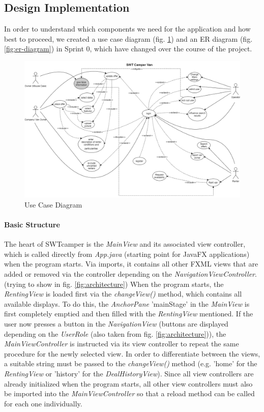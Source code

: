 \subsection{Design Implementation}
In order to understand which components we need for the application and how best to proceed, we created a use case diagram (fig. \ref{fig:use-case-diagram}) and an ER diagram (fig. \ref{fig:er-diagram}) in Sprint 0, which have changed over the course of the project.

\begin{figure}[h]
	\centering
	\includegraphics[width=12cm]{resources/images/use-case-diagram.png}
	\caption{Use Case Diagram}
	\label{fig:use-case-diagram}
\end{figure}

\paragraph{Basic Structure}
The heart of SWTcamper is the \textit{MainView} and its associated view controller, which is called directly from \textit{App.java} (starting point for JavaFX applications) when the program starts. Via imports, it contains all other FXML views that are added or removed via the controller depending on the \textit{NavigationViewController}. (trying to show in fig. \ref{fig:architecture}) When the program starts, the \textit{RentingView} is loaded first via the \textit{changeView()} method, which contains all available displays. To do this, the \textit{AnchorPane} 'mainStage' in the \textit{MainView} is first completely emptied and then filled with the \textit{RentingView} mentioned. If the user now presses a button in the \textit{NavigationView} (buttons are displayed depending on the \textit{UserRole} (also taken from fig. \ref{fig:architecture})), the \textit{MainViewController} is instructed via its view controller to repeat the same procedure for the newly selected view. In order to differentiate between the views, a suitable string must be passed to the \textit{changeView()} method (e.g. 'home' for the \textit{RentingView} or 'history' for the \textit{DealHistoryView}). Since all view controllers are already initialized when the program starts, all other view controllers must also be imported into the \textit{MainViewController} so that a reload method can be called for each one individually.

